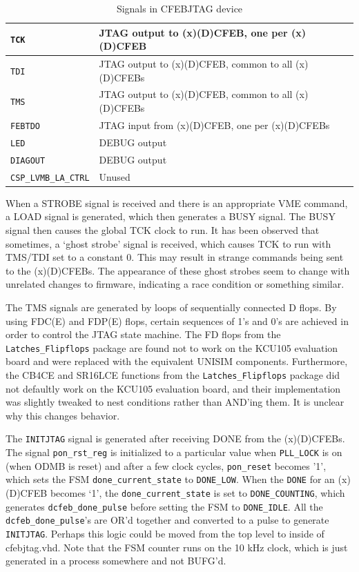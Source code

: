 \documentclass[10pt,a4paper]{article}
\begin{document}
\begin{table}[H]
\begin{tabular}{|l|l|}
\texttt{TCK}& JTAG output to (x)(D)CFEB, one per (x)(D)CFEB\\ \hline
\texttt{TDI}& JTAG output to (x)(D)CFEB, common to all (x)(D)CFEBs\\ \hline
\texttt{TMS}& JTAG output to (x)(D)CFEB, common to all (x)(D)CFEBs\\ \hline
\texttt{FEBTDO}& JTAG input from (x)(D)CFEB, one per (x)(D)CFEBs\\ \hline
\texttt{LED}& DEBUG output\\ \hline
\texttt{DIAGOUT}& DEBUG output\\ \hline
\texttt{CSP\_LVMB\_LA\_CTRL}& Unused\\ \hline
\end{tabular}
\caption{Signals in CFEBJTAG device}
\label{tab:cfebjtaginterface}
\end{table}

When a STROBE signal is received and there is an appropriate VME command, a LOAD signal is generated, which then generates a BUSY signal. The BUSY signal then causes the global TCK clock to run. It has been observed that sometimes, a `ghost strobe' signal is received, which causes TCK to run with TMS/TDI set to a constant 0. This may result in strange commands being sent to the (x)(D)CFEBs. The appearance of these ghost strobes seem to change with unrelated changes to firmware, indicating a race condition or something similar. 

The TMS signals are generated by loops of sequentially connected D flops. By using FDC(E) and FDP(E) flops, certain sequences of 1's and 0's are achieved in order to control the JTAG state machine. The FD flops from the \texttt{Latches\_Flipflops} package are found not to work on the KCU105 evaluation board and were replaced with the equivalent UNISIM components. Furthermore, the CB4CE and SR16LCE functions from the \texttt{Latches\_Flipflops} package did not defaultly work on the KCU105 evaluation board, and their implementation was slightly tweaked to nest conditions rather than AND'ing them. It is unclear why this changes behavior.

The \texttt{INITJTAG} signal is generated after receiving DONE from the (x)(D)CFEBs. The signal \texttt{pon\_rst\_reg} is initialized to a particular value when \texttt{PLL\_LOCK} is on (when ODMB is reset) and after a few clock cycles, \texttt{pon\_reset} becomes '1', which sets the FSM \texttt{done\_current\_state} to \texttt{DONE\_LOW}. When the \texttt{DONE} for an (x)(D)CFEB becomes `1', the \texttt{done\_current\_state} is set to \texttt{DONE\_COUNTING}, which generates \texttt{dcfeb\_done\_pulse} before setting the FSM to \texttt{DONE\_IDLE}. All the \texttt{dcfeb\_done\_pulse}'s are OR'd together and converted to a pulse to generate \texttt{INITJTAG}. Perhaps this logic could be moved from the top level to inside of cfebjtag.vhd. Note that the FSM counter runs on the 10 kHz clock, which is just generated in a process somewhere and not BUFG'd. 
\end{document}
